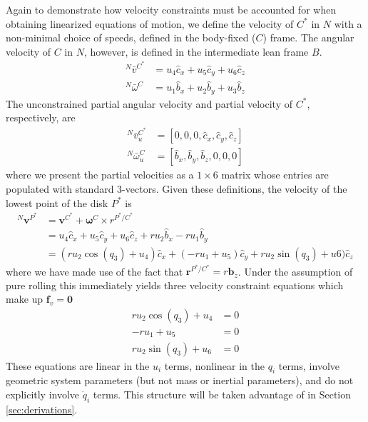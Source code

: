 \documentclass[smallcondensed,final]{svjour3}                     %
\begin{document}
Again to demonstrate how velocity constraints must be accounted for when
obtaining linearized equations of motion, we define the velocity of $C^*$ in
$N$ with a non-minimal choice of speeds, defined in the body-fixed ($C$) frame.
The angular velocity of $C$ in $N$, however, is defined in the intermediate
lean frame $B$.
\begin{align}
  \label{v_u}
  {^N}\bar{v}^{C^*} &= u_4 \hat{c}_x + u_5 \hat{c}_y + u_6 \hat{c}_z \\
  \label{w_u}
  {^N}\bar{\omega}^C &= u_1 \hat{b}_x + u_2 \hat{b}_y + u_3 \hat{b}_z
\end{align}
The unconstrained partial angular velocity and partial velocity of $C^*$,
respectively, are
\begin{align}
  {^N}\bar{v}^{C^*}_u &= [0, 0, 0, \hat{c}_x, \hat{c}_y, \hat{c}_z] \\
  {^N}\bar{\omega}^C_u &= [\hat{b}_x, \hat{b}_y, \hat{b}_z, 0, 0, 0]
\end{align}
where we present the partial velocities as a $1\times6$ matrix whose entries
are populated with standard 3-vectors. Given these definitions, the velocity of
the lowest point of the disk $P^*$ is
\begin{align*}
    {^N}\bm{v}^{P^*} &= \bm{v}^{C^*} + \bm{\omega}^{C} \times r^{P^*/C^*} \\
                     &= u_4\hat{c}_x + u_5\hat{c}_y + u_6\hat{c}_z + r u_2
                        \hat{b}_x - r u_1 \hat{b}_y \\
                     &= (r u_2 \cos(q_3) + u_4) \hat{c}_x + (-r
                        u_1 + u_5)\hat{c}_y + r u_2 \sin(q_3) +
                        u6) \hat{c}_z
\end{align*}
where we have made use of the fact that $\bm{r}^{P^*/C^*} = r\bm{b}_z$.
Under the assumption of pure rolling this immediately yields three velocity
constraint equations which make up $\mathbf{f}_v = \mathbf{0}$
\begin{subequations}
\label{rd:f_v}
\begin{align}
    r u_2 \cos(q_3) + u_4 &= 0\\
            -r u_1 + u_5 &= 0\\
    r u_2 \sin(q_3) + u_6 &= 0
\end{align}
\end{subequations}
These equations are linear in the $u_i$ terms, nonlinear in the $q_i$ terms,
involve geometric system parameters (but not mass or inertial parameters), and
do not explicitly involve $\dot{q}_i$ terms. This structure will be taken
advantage of in Section \ref{sec:derivations}.
\end{document}

